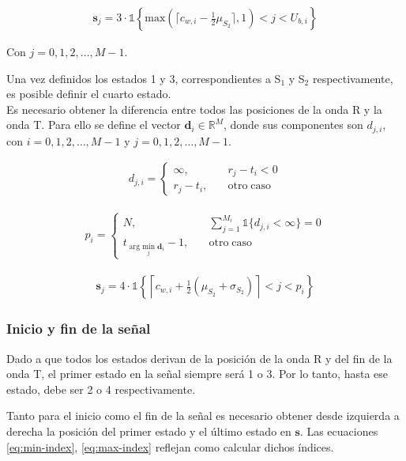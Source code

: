\begin{align}
    \mathbf{s}_j = 3 \cdot \mathds{1}\left\{\mathrm{max}\left(\lceil c_{w,i}-\frac{1}{2}\mu_{S_2}\rceil, 1\right) < j < U_{b,i}\right\}
\end{align}

\indent Con $j=0,1,2,\dots,M-1$. \bigskip

 \indent Una vez definidos los estados 1 y 3, correspondientes a S$_1$ y S$_2$ respectivamente, es posible definir el cuarto estado. \\
\indent Es necesario obtener la diferencia entre todos las posiciones de la onda R y la onda T. Para ello se define el vector $\mathbf{d}_i \in \mathbb{R}^M$, donde sus componentes son $d_{j,i}$, con $i = 0,1,2,\dots,M-1$ y $j = 0,1,2,\dots,M-1$. 

\begin{align}
    d_{j,i} = \begin{cases}
                \infty, \qquad &r_j - t_i < 0 \\
                r_j - t_i, \quad &\mathrm{otro \; caso}
              \end{cases}
\end{align}


\begin{align}
    p_i = \begin{cases}
            N, \quad &\sum_{j=1}^{M_i} \mathds{1}\big\{d_{j,i} < \infty\big\} =  0  \\
            t_{\arg \underset{j}{\mathrm{min}} \; \mathbf{d}_i} -1, \quad  & \mathrm{otro \; caso}
          \end{cases}
\end{align}

\begin{align}
    \mathbf{s}_j = 4 \cdot \mathds{1}\left\{\left\lceil c_{w,i} + \frac{1}{2}(\mu_{S_2} + \sigma_{S_2}) \right\rceil < j < p_i  \right\}
\end{align}

\subsubsection*{Inicio y fin de la señal}

\indent Dado a que todos los estados derivan de la posición de la onda R y del fin de la onda T, el primer estado en la señal siempre será 1 o 3. Por lo tanto, hasta ese estado, debe ser 2 o 4 respectivamente. 

\indent Tanto para el inicio como el fin de la señal es necesario obtener desde izquierda a derecha la posición del primer estado y el último estado en $\mathbf{s}$. Las ecuaciones \ref{eq:min-index}, \ref{eq:max-index} reflejan como calcular dichos índices.

